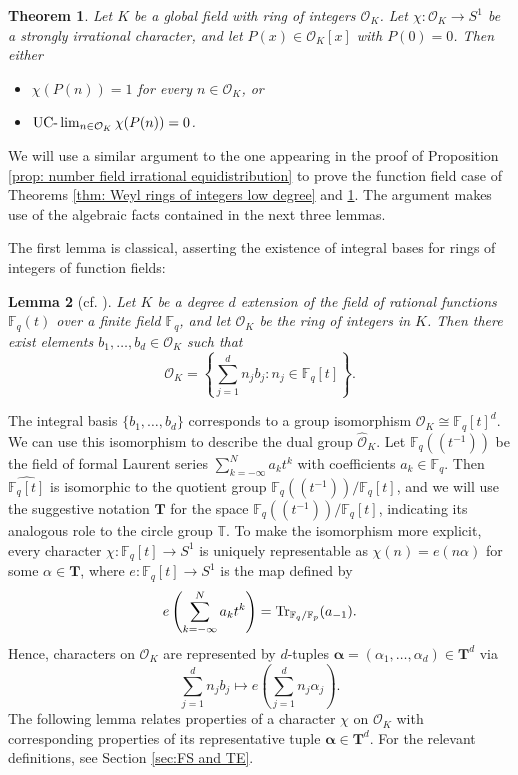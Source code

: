 \documentclass{amsart}
\newtheorem{theorem}{Theorem}[section]
\newtheorem{lemma}[theorem]{Lemma}
\theoremstyle{definition}
\numberwithin{equation}{section}
\newcommand{\T}{\mathbb{T}}
\newcommand{\F}{\mathbb{F}}
\newcommand{\mO}{\mathcal{O}}
\renewcommand{\hat}{\widehat}
\newcommand{\UClim}{\textup{UC-}\lim}
\begin{document}
\begin{theorem} \label{thm: Weyl rings of integers}
    Let $K$ be a global field with ring of integers $\mO_K$.
    Let $\chi : \mO_K \to S^1$ be a strongly irrational character, and let $P(x) \in \mO_K[x]$ with $P(0) = 0$.
    Then either
    \begin{itemize}
        \item $\chi(P(n)) = 1$ for every $n \in \mO_K$, or
        \item $\UClim_{n \in \mO_K} \chi(P(n)) = 0$.
    \end{itemize}
\end{theorem}

We will use a similar argument to the one appearing in the proof of Proposition \ref{prop: number field irrational equidistribution} to prove the function field case of Theorems \ref{thm: Weyl rings of integers low degree} and \ref{thm: Weyl rings of integers}.
The argument makes use of the algebraic facts contained in the next three lemmas.

The first lemma is classical, asserting the existence of integral bases for rings of integers of function fields:

\begin{lemma}[cf. {\cite[Chapter IV, Theorem 3]{chevalley}}]
    Let $K$ be a degree $d$ extension of the field of rational functions $\F_q(t)$ over a finite field $\F_q$, and let $\mO_K$ be the ring of integers in $K$.
    Then there exist elements $b_1, \dots, b_d \in \mO_K$ such that
    \begin{equation*}
        \mO_K = \left\{ \sum_{j=1}^d n_j b_j : n_j \in \F_q[t] \right\}.
    \end{equation*}
\end{lemma}

The integral basis $\{b_1, \dots, b_d\}$ corresponds to a group isomorphism $\mO_K \cong \F_q[t]^d$.
We can use this isomorphism to describe the dual group $\hat{\mO}_K$.
Let $\F_q((t^{-1}))$ be the field of formal Laurent series $\sum_{k=-\infty}^N a_k t^k$ with coefficients $a_k \in \F_q$.
Then $\hat{\F_q[t]}$ is isomorphic to the quotient group $\F_q((t^{-1}))/\F_q[t]$, and we will use the suggestive notation $\mathbf{T}$ for the space $\F_q((t^{-1}))/\F_q[t]$, indicating its analogous role to the circle group $\T$.
To make the isomorphism more explicit, every character $\chi : \F_q[t] \to S^1$ is uniquely representable as $\chi(n) = e(n\alpha)$ for some $\alpha \in \mathbf{T}$, where $e : \F_q[t] \to S^1$ is the map defined by
\begin{equation*}
    e \left( \sum_{k=-\infty}^N a_k t^k \right) = \textup{Tr}_{\F_q/\F_p}(a_{-1}).
\end{equation*}
Hence, characters on $\mO_K$ are represented by $d$-tuples $\bm{\alpha} = (\alpha_1, \dots, \alpha_d) \in \mathbf{T}^d$ via
\begin{equation*}
    \sum_{j=1}^d n_j b_j \mapsto e \left( \sum_{j=1}^d n_j \alpha_j \right).
\end{equation*}
The following lemma relates properties of a character $\chi$ on $\mO_K$ with corresponding properties of its representative tuple $\bm{\alpha} \in \mathbf{T}^d$.
For the relevant definitions, see Section \ref{sec:FS and TE}.
\end{document}

